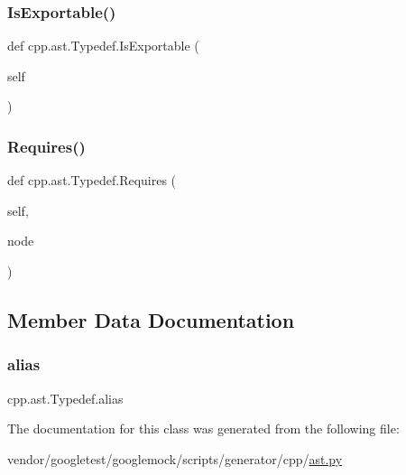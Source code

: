 \mbox{\label{classcpp_1_1ast_1_1_typedef_adee58e4674b049d8e4435b5b6ad8e1d4}} 
\subsubsection{\texorpdfstring{Is\+Exportable()}{IsExportable()}}
{\footnotesize\ttfamily def cpp.\+ast.\+Typedef.\+Is\+Exportable (\begin{DoxyParamCaption}\item[{}]{self }\end{DoxyParamCaption})}

\mbox{\label{classcpp_1_1ast_1_1_typedef_aa9f65f4a97ba340f2c9ebc5e7ce27e8c}} 
\subsubsection{\texorpdfstring{Requires()}{Requires()}}
{\footnotesize\ttfamily def cpp.\+ast.\+Typedef.\+Requires (\begin{DoxyParamCaption}\item[{}]{self,  }\item[{}]{node }\end{DoxyParamCaption})}



\subsection{Member Data Documentation}
\mbox{\label{classcpp_1_1ast_1_1_typedef_a3187a504dfbefe50b866b44902823c30}} 
\subsubsection{\texorpdfstring{alias}{alias}}
{\footnotesize\ttfamily cpp.\+ast.\+Typedef.\+alias}



The documentation for this class was generated from the following file\+:\begin{DoxyCompactItemize}
\item 
vendor/googletest/googlemock/scripts/generator/cpp/\hyperlink{ast_8py}{ast.\+py}\end{DoxyCompactItemize}
